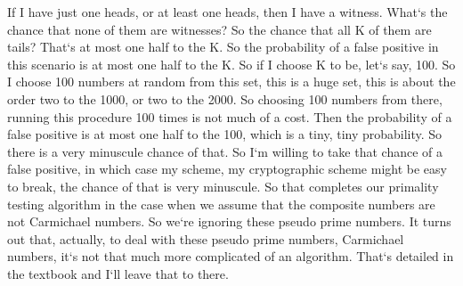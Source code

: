 If I have just one heads, or at least one heads, then I have a witness.
What`s the chance that none of them are witnesses? So the chance that all K of them are tails? That`s at most one half to the K\@.
So the probability of a false positive in this scenario is at most one half to the K\@.
So if I choose K to be, let`s say, 100.
So I choose 100 numbers at random from this set, this is a huge set, this is about the order two to the 1000, or two to the 2000.
So choosing 100 numbers from there, running this procedure 100 times is not much of a cost.
Then the probability of a false positive is at most one half to the 100, which is a tiny, tiny probability.
So there is a very minuscule chance of that.
So I`m willing to take that chance of a false positive, in which case my scheme, my cryptographic scheme might be easy to break, the chance of that is very minuscule.
So that completes our primality testing algorithm in the case when we assume that the composite numbers are not Carmichael numbers.
So we`re ignoring these pseudo prime numbers.
It turns out that, actually, to deal with these pseudo prime numbers, Carmichael numbers, it`s not that much more complicated of an algorithm.
That`s detailed in the textbook and I`ll leave that to there.

